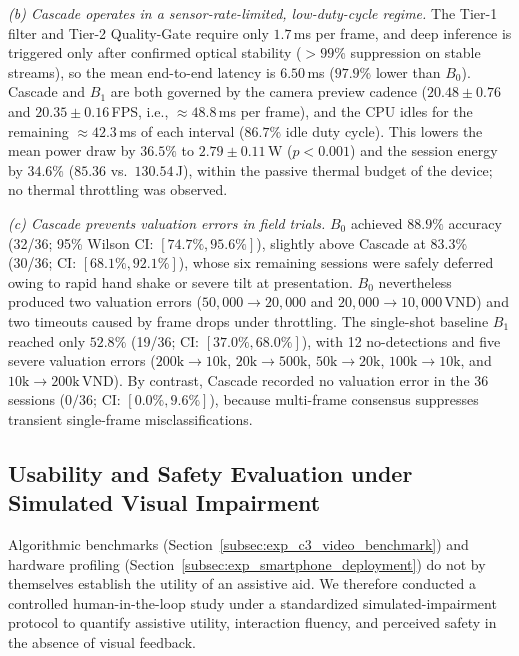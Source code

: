 \documentclass[final,5p,times,twocolumn,authoryear]{elsarticle}
\begin{document}
\textit{(b) Cascade operates in a sensor-rate-limited, low-duty-cycle regime.} The Tier-1 filter and Tier-2 Quality-Gate require only $1.7$\,ms per frame, and deep inference is triggered only after confirmed optical stability ($>99\%$ suppression on stable streams), so the mean end-to-end latency is $6.50$\,ms ($97.9\%$ lower than $B_0$). Cascade and $B_1$ are both governed by the camera preview cadence ($20.48 \pm 0.76$ and $20.35 \pm 0.16$\,FPS, i.e., $\approx 48.8$\,ms per frame), and the CPU idles for the remaining $\approx 42.3$\,ms of each interval ($86.7\%$ idle duty cycle). This lowers the mean power draw by $36.5\%$ to $2.79 \pm 0.11$\,W ($p < 0.001$) and the session energy by $34.6\%$ ($85.36$ vs.\ $130.54$\,J), within the passive thermal budget of the device; no thermal throttling was observed.

\textit{(c) Cascade prevents valuation errors in field trials.} $B_0$ achieved $88.9\%$ accuracy (32/36; 95\% Wilson CI: $[74.7\%, 95.6\%]$), slightly above Cascade at $83.3\%$ (30/36; CI: $[68.1\%, 92.1\%]$), whose six remaining sessions were safely deferred owing to rapid hand shake or severe tilt at presentation. $B_0$ nevertheless produced two valuation errors ($50{,}000 \to 20{,}000$ and $20{,}000 \to 10{,}000$\,VND) and two timeouts caused by frame drops under throttling. The single-shot baseline $B_1$ reached only $52.8\%$ (19/36; CI: $[37.0\%, 68.0\%]$), with 12 no-detections and five severe valuation errors ($200\text{k} \to 10\text{k}$, $20\text{k} \to 500\text{k}$, $50\text{k} \to 20\text{k}$, $100\text{k} \to 10\text{k}$, and $10\text{k} \to 200\text{k}$\,VND). By contrast, Cascade recorded no valuation error in the 36 sessions ($0/36$; CI: $[0.0\%, 9.6\%]$), because multi-frame consensus suppresses transient single-frame misclassifications.

\subsection{Usability and Safety Evaluation under Simulated Visual Impairment}
\label{subsec:user_study}

Algorithmic benchmarks (Section~\ref{subsec:exp_c3_video_benchmark}) and hardware profiling (Section~\ref{subsec:exp_smartphone_deployment}) do not by themselves establish the utility of an assistive aid. We therefore conducted a controlled human-in-the-loop study under a standardized simulated-impairment protocol to quantify assistive utility, interaction fluency, and perceived safety in the absence of visual feedback.
\end{document}
